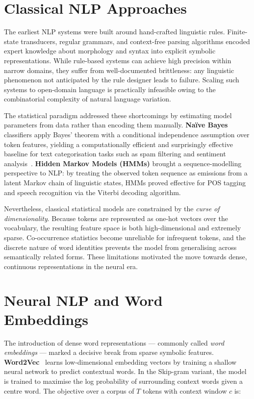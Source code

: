 \documentclass[12pt, a4paper]{article}
\begin{document}
\section{Classical NLP Approaches}

The earliest NLP systems were built around hand-crafted linguistic rules.
Finite-state transducers, regular grammars, and context-free parsing algorithms
encoded expert knowledge about morphology and syntax into explicit symbolic
representations. While rule-based systems can achieve high precision within
narrow domains, they suffer from well-documented brittleness: any linguistic
phenomenon not anticipated by the rule designer leads to failure. Scaling such
systems to open-domain language is practically infeasible owing to the
combinatorial complexity of natural language variation.

The statistical paradigm addressed these shortcomings by estimating model
parameters from data rather than encoding them manually. \textbf{Naïve Bayes}
classifiers apply Bayes' theorem with a conditional independence assumption
over token features, yielding a computationally efficient and surprisingly
effective baseline for text categorisation tasks such as spam filtering and
sentiment analysis~\cite{manning1999statistical}. \textbf{Hidden Markov Models
(HMMs)} brought a sequence-modelling perspective to NLP: by treating the
observed token sequence as emissions from a latent Markov chain of linguistic
states, HMMs proved effective for POS tagging and speech recognition via the
Viterbi decoding algorithm.

Nevertheless, classical statistical models are constrained by the
\textit{curse of dimensionality}. Because tokens are represented as one-hot
vectors over the vocabulary, the resulting feature space is both
high-dimensional and extremely sparse. Co-occurrence statistics become
unreliable for infrequent tokens, and the discrete nature of word identities
prevents the model from generalising across semantically related forms. These
limitations motivated the move towards dense, continuous representations in the
neural era.


\section{Neural NLP and Word Embeddings}

The introduction of dense word representations --- commonly called
\textit{word embeddings} --- marked a decisive break from sparse symbolic
features. \textbf{Word2Vec}~\cite{mikolov2013word2vec} learns low-dimensional
embedding vectors by training a shallow neural network to predict contextual
words. In the Skip-gram variant, the model is trained to maximise the log
probability of surrounding context words given a centre word. The objective
over a corpus of $T$ tokens with context window $c$ is:
\end{document}
